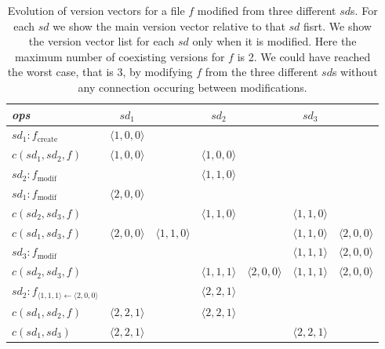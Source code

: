 \documentclass[letterpaper,twocolumn,10pt]{article}
\begin{document}
\begin{table*}[t]
\begin{center}
  \begin{tabular}[t]{|l||cc|cc|cc|}
    \hline
    \emph{ops} & $sd_{1}$ & & $sd_{2}$ & & $sd_{3}$ & \\
    \hline

    $sd_{1} : f_{\text{create}}$ & 
    $\langle 1,0,0\rangle$ & &
     & &
     & \\

    $c(sd_{1},sd_{2},f)$ &
    $\langle 1,0,0 \rangle$ & &
    $\langle 1,0,0 \rangle$ & &
     & \\

    $sd_{2} : f_{\text{modif}}$ & 
    & &
    $\langle 1,1,0 \rangle$ & &
     & \\

    $sd_{1} : f_{\text{modif}}$ &
    $\langle 2,0,0 \rangle$ & &
    & &
     & \\

    $c(sd_{2},sd_{3},f)$ &
    & & 
    $\langle 1,1,0 \rangle$ & &
    $\langle 1,1,0 \rangle$ & \\

    $c(sd_{1},sd_{3},f)$ &
    $\langle 2,0,0 \rangle$ & $\langle 1,1,0 \rangle$ &
    & &
    $\langle 1,1,0 \rangle$ & $\langle 2,0,0 \rangle$ \\

    $sd_{3} : f_{\text{modif}}$ &
    & &
    & & 
    $\langle 1,1,1 \rangle$ & $\langle 2,0,0 \rangle$ \\

    $c(sd_{2},sd_{3},f)$ &
    & &
    $\langle 1,1,1 \rangle$ & $\langle 2,0,0 \rangle$ & 
    $\langle 1,1,1 \rangle$ & $\langle 2,0,0 \rangle$ \\

    $sd_{2} : f_{\langle 1,1,1 \rangle \leftarrow \langle 2,0,0 \rangle}$ &
    & &
    $\langle 2,2,1 \rangle$ & &
    & \\

    $c(sd_{1},sd_{2},f)$ &
    $\langle 2,2,1 \rangle$ & &
    $\langle 2,2,1 \rangle$ & & 
    & \\

    $c(sd_{1},sd_{3})$ &
    $\langle 2,2,1 \rangle$ & &
    & &
    $\langle 2,2,1 \rangle$ & \\

    \hline
  \end{tabular}
\end{center}
\caption{Evolution of version vectors for a file $f$ modified from
  three different $sd$s. For each $sd$ we show the main version
  vector relative to that $sd$ fisrt. We show the version vector list
  for each $sd$ only when it is modified.
  Here the maximum number of
  coexisting versions for $f$ is 2. We could have reached the worst
  case, that is 3, by modifying $f$ from the three different $sd$s
  without any connection occuring between modifications.}
\end{table*}
\end{document}
